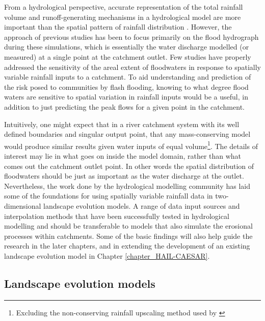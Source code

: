 From a hydrological perspective, accurate representation of the total rainfall volume and runoff-generating mechanisms in a hydrological model are more important than the spatial pattern of rainfall distribution \citep{gabellani2007propagation,nicotina2008impact}. However, the approach of previous studies has been to focus primarily on the flood hydrograph during these simulations, which is essentially the water discharge modelled (or measured) at a single point at the catchment outlet. Few studies have properly addressed the sensitivity of the areal extent of floodwaters in response to spatially variable rainfall inputs to a catchment. To aid understanding and prediction of the risk posed to communities by flash flooding, knowing to what degree flood waters are sensitive to spatial variation in rainfall inputs would be a useful, in addition to just predicting the peak flows for a given point in the catchment.

Intuitively, one might expect that in a river catchment system with its well defined boundaries and singular output point, that any mass-conserving model would produce similar results given water inputs of equal volume\footnote{Excluding the non-conserving rainfall upscaling method used by \citet{nicotina2008impact}}. The details of interest may lie in what goes on inside the model domain, rather than what comes out the catchment outlet point. In other words the spatial distribution of floodwaters should be just as important as the water discharge at the outlet. Nevertheless, the work done by the hydrological modelling community has laid some of the foundations for using spatially variable rainfall data in two-dimensional landscape evolution models. A range of data input sources and interpolation methods that have been successfully tested in hydrological modelling and should be transferable to models that also simulate the erosional processes within catchments. Some of the basic findings will also help guide the research in the later chapters, and in extending the development of an existing landscape evolution model in Chapter \ref{chapter_HAIL-CAESAR}.

\subsection{Landscape evolution models}

